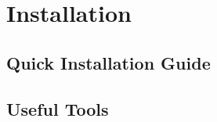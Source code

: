 \chapter{Installation}


\section{Quick Installation Guide}




\section{Useful Tools}

















